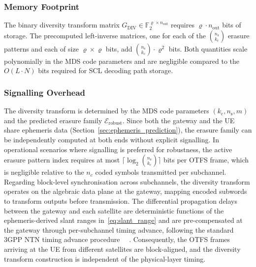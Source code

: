 \documentclass[lettersize,journal]{IEEEtran}
\providecommand{\DIFadd}[1]{{\protect\color{blue}#1}} %
\begin{document}
{\subsubsection{\DIFadd{Memory Footprint}}
\DIFadd{The binary diversity transform matrix
$G_{\mathrm{DIV}} \in \mathbb{F}_2^{\varrho \times n_{\mathrm{out}}}$
requires $\varrho \cdot n_{\mathrm{out}}$ bits of storage.
The precomputed left-inverse matrices, one for each of the
$\binom{n_{\mathrm{s}}}{k_{\mathrm{c}}}$ erasure patterns and
each of size $\varrho \times \varrho$ bits, add
$\binom{n_{\mathrm{s}}}{k_{\mathrm{c}}} \cdot \varrho^2$ bits.
Both quantities scale polynomially in the MDS code parameters and
are negligible compared to the $O(L \cdot N)$ bits required for
SCL decoding path storage.
}

\subsubsection{\DIFadd{Signalling Overhead}}
\DIFadd{The diversity transform is determined by the MDS code parameters
$(k_{\mathrm{c}}, n_{\mathrm{s}}, m)$ and the predicted erasure
family $\mathcal{E}_{\mathrm{robust}}$. Since both the gateway
and the UE share ephemeris data
(Section~\ref{sec:ephemeris_prediction}), the erasure family can
be independently computed at both ends without explicit signalling.
In operational scenarios where signalling is preferred for
robustness, the active erasure pattern index requires at most
$\lceil\log_2\binom{n_{\mathrm{s}}}{k_{\mathrm{c}}}\rceil$ bits
per OTFS frame, which is negligible relative to the $n_c$ coded
symbols transmitted per subchannel.
Regarding block-level synchronisation across subchannels, the
diversity transform operates on the algebraic data plane at the
gateway, mapping encoded subwords to transform outputs before
transmission. The differential propagation delays between the
gateway and each satellite are deterministic functions of the
ephemeris-derived slant ranges in~\eqref{eq:slant_range} and are
pre-compensated at the gateway through per-subchannel timing
advance, following the standard 3GPP NTN timing advance
procedure~\mbox{%
\cite{3GPP38821}}\hskip0pt%
. Consequently, the OTFS frames
arriving at the UE from different satellites are block-aligned,
and the diversity transform construction is independent of the
physical-layer timing.
}}%
\end{document}
